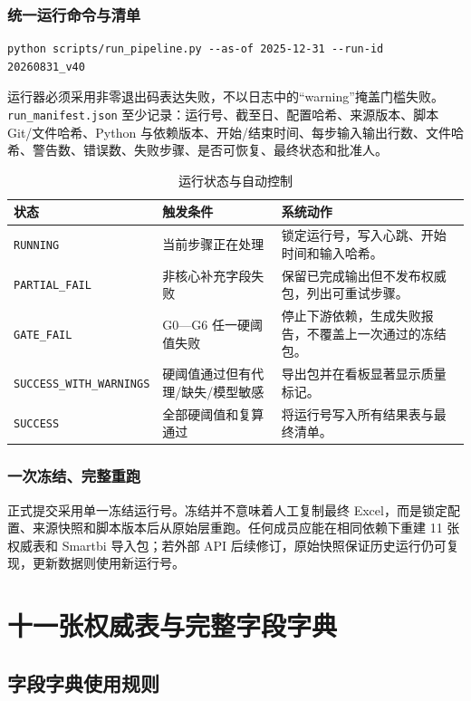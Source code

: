 \documentclass[UTF8,fontset=windows,12pt,openany]{ctexbook}
\newcommand{\Field}[1]{{\small\nolinkurl{#1}}}
\newcommand{\File}[1]{{\small\nolinkurl{#1}}}
\begin{document}
\section{统一运行命令与清单}

\begin{verbatim}
python scripts/run_pipeline.py --as-of 2025-12-31 --run-id 20260831_v40
\end{verbatim}

运行器必须采用非零退出码表达失败，不以日志中的“warning”掩盖门槛失败。\File{run_manifest.json} 至少记录：运行号、截至日、配置哈希、来源版本、脚本 Git/文件哈希、Python 与依赖版本、开始/结束时间、每步输入输出行数、文件哈希、警告数、错误数、失败步骤、是否可恢复、最终状态和批准人。

\begin{longtable}{p{3.5cm}p{4.2cm}p{5.7cm}}
\caption{运行状态与自动控制}\label{tab:run-status}\\
\toprule
\textbf{状态} & \textbf{触发条件} & \textbf{系统动作}\\
\midrule
\Field{RUNNING} & 当前步骤正在处理 & 锁定运行号，写入心跳、开始时间和输入哈希。\\
\Field{PARTIAL_FAIL} & 非核心补充字段失败 & 保留已完成输出但不发布权威包，列出可重试步骤。\\
\Field{GATE_FAIL} & G0—G6 任一硬阈值失败 & 停止下游依赖，生成失败报告，不覆盖上一次通过的冻结包。\\
\Field{SUCCESS_WITH_WARNINGS} & 硬阈值通过但有代理/缺失/模型敏感 & 导出包并在看板显著显示质量标记。\\
\Field{SUCCESS} & 全部硬阈值和复算通过 & 将运行号写入所有结果表与最终清单。\\
\bottomrule
\end{longtable}

\section{一次冻结、完整重跑}

正式提交采用单一冻结运行号。冻结并不意味着人工复制最终 Excel，而是锁定配置、来源快照和脚本版本后从原始层重跑。任何成员应能在相同依赖下重建 11 张权威表和 Smartbi 导入包；若外部 API 后续修订，原始快照保证历史运行仍可复现，更新数据则使用新运行号。

\part{十一张权威表与完整字段字典}

\chapter{字段字典使用规则}
\end{document}
